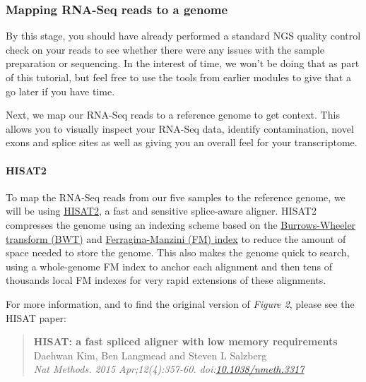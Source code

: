 \documentclass[11pt]{article}
\begin{document}
    \hypertarget{mapping-rna-seq-reads-to-a-genome}{%
\subsubsection{Mapping RNA-Seq reads to a
genome}\label{mapping-rna-seq-reads-to-a-genome}}

By this stage, you should have already performed a standard NGS quality
control check on your reads to see whether there were any issues with
the sample preparation or sequencing. In the interest of time, we won't
be doing that as part of this tutorial, but feel free to use the tools
from earlier modules to give that a go later if you have time.

Next, we map our RNA-Seq reads to a reference genome to get context.
This allows you to visually inspect your RNA-Seq data, identify
contamination, novel exons and splice sites as well as giving you an
overall feel for your transcriptome.

\hypertarget{hisat2}{%
\paragraph{HISAT2}\label{hisat2}}

To map the RNA-Seq reads from our five samples to the reference genome,
we will be using
\href{https://ccb.jhu.edu/software/hisat2/index.shtml}{HISAT2}, a fast
and sensitive splice-aware aligner. HISAT2 compresses the genome using
an indexing scheme based on the
\href{https://en.wikipedia.org/wiki/Burrows\%E2\%80\%93Wheeler_transform}{Burrows-Wheeler
transform (BWT)} and
\href{https://en.wikipedia.org/wiki/FM-index}{Ferragina-Manzini (FM)
index} to reduce the amount of space needed to store the genome. This
also makes the genome quick to search, using a whole-genome FM index to
anchor each alignment and then tens of thousands local FM indexes for
very rapid extensions of these alignments.

For more information, and to find the original version of \textit{Figure
2}, please see the HISAT paper:

\begin{quote}
\textbf{HISAT: a fast spliced aligner with low memory requirements}\\
Daehwan Kim, Ben Langmead and Steven L Salzberg\\
\textit{Nat Methods. 2015 Apr;12(4):357-60.
doi:\href{https://www.nature.com/articles/nmeth.3317}{10.1038/nmeth.3317}}
\end{quote}
\end{document}

